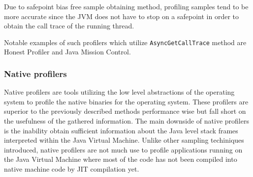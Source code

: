 \documentclass[..thesis.tex]{subfiles}
\begin{document}
Due to safepoint bias free sample obtaining method, profiling samples tend to be more accurate since the JVM does not have to stop on a safepoint in order to obtain the call trace of the running thread. 

Notable examples of such profilers which utilize \texttt{Async\-Get\-Call\-Trace} method  are Honest Profiler and Java Mission Control. 

\subsubsection{Native profilers}
Native profilers are tools utilizing the low level abstractions of the operating system to  profile the native binaries for the operating system. These profilers are superior to the previously described methods performance wise but fall short on the usefulness of the gathered information. The main downside of native profilers is the inability obtain sufficient information about the Java level stack frames interpreted within the Java Virtual Machine. Unlike other sampling techiniques introduced, native profilers are not much use to profile applications running on the Java Virtual Machine where most of the code has not been compiled into native machine code by JIT compilation yet.


\end{document}
